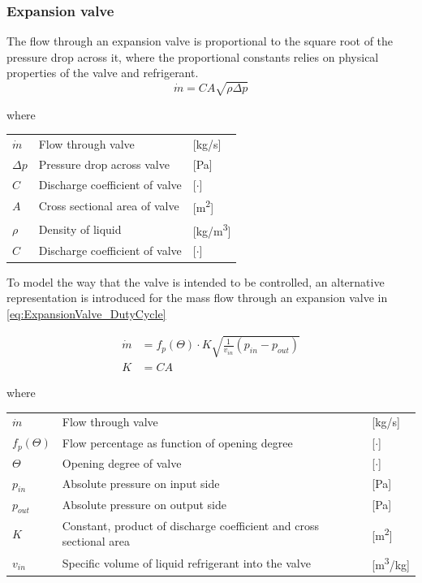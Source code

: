\subsubsection{Expansion valve}
The flow through an expansion valve is proportional to the square root of the pressure drop across it, where the proportional constants relies on physical properties of the valve and refrigerant.
\begin{equation} \label{eq:ExpansionValve}
	\dot{m}= C A \sqrt{\rho\Delta p}
\end{equation}

where
\begin{center}
	\begin{tabular}{l p{8cm} l}
		$\dot{m}$ 	& Flow through valve & [\si{kg}/\si{s}]\\
		$\Delta p$ 	& Pressure drop across valve & [\si{Pa}]\\
		$C$ 		& Discharge coefficient of valve & [$\cdot$]\\
		$A$	 		& Cross sectional area of valve & [\si{m^2}]\\
		$\rho$ 		& Density of liquid & [\si{kg}/\si{m^3}]\\
			$C$ 	& Discharge coefficient of valve & [$\cdot$]\\
	\end{tabular}
\end{center}

To model the way that the valve is intended to be controlled, an alternative representation is introduced for the mass flow through an expansion valve in \cref{eq:ExpansionValve_DutyCycle}


\begin{equation} \label{eq:ExpansionValve_DutyCycle}
	\begin{split}
		\dot{m} &= f_p(\Theta) \cdot K  \sqrt{\frac{1}{v_{in}} (p_{in} - p_{out})}\\
		K 			&= C A
	\end{split}
\end{equation}

where
\begin{center}
	\begin{tabular}{l p{8cm} l}
		$\dot{m}$	& Flow through valve & [\si{kg}/\si{s}]\\
		$f_p(\Theta)$ & Flow percentage as function of opening degree & [$\cdot$] \\
		$ \Theta $ & Opening degree of valve& [$ \cdot $]\\
		$p_{in}$ 	& Absolute pressure on input side & [\si{Pa}]\\
		$p_{out}$ 	& Absolute pressure on output side & [\si{Pa}]\\
		$K$ 		& Constant, product of discharge coefficient and cross sectional area & [\si{m^2}]\\
		$v_{in}$ 	& Specific volume of liquid refrigerant into the valve & [\si{m^3}/\si{kg}]

	\end{tabular}
\end{center}

